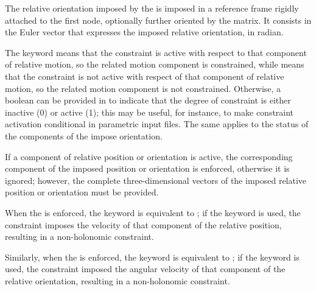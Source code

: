 The relative orientation imposed by the 
is imposed in a reference frame rigidly attached to the first node,
optionally further oriented by the 
matrix.
It consists in the Euler vector that expresses
the imposed relative orientation, in radian.

The keyword  means that the constraint is active
with respect to that component of relative motion,
so the related motion component is constrained,
while  means that the constraint is not active
with respect of that component of relative motion,
so the related motion component is not constrained.
Otherwise, a boolean can be provided in  to indicate
that the degree of constraint is either inactive (0) or active (1);
this may be useful, for instance, to make constraint activation
conditional in parametric input files.
The same applies to the status of the components of the impose orientation.

If a component of relative position or orientation is active,
the corresponding component of the imposed position or orientation
is enforced, otherwise it is ignored;
however, the complete three-dimensional vectors of the imposed relative
position or orientation must be provided.

When the  is enforced, the keyword 
is equivalent to ; if the keyword  is used,
the constraint imposes the velocity of that component of the relative position,
resulting in a non-holonomic constraint.

Similarly, when the  is enforced,
the keyword  is equivalent to ;
if the keyword  is used,
the constraint imposed the angular velocity of that component
of the relative orientation, resulting in a non-holonomic constraint.

